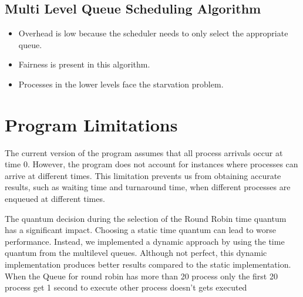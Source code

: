 \documentclass{article}
\begin{document}
\subsection{Multi Level Queue Scheduling Algorithm}
\begin{itemize}
  \item Overhead is low because the scheduler needs to only select the appropriate queue.
  \item Fairness is present in this algorithm.
  \item Processes in the lower levels face the starvation problem.
\end{itemize}

\section{Program Limitations}
The current version of the program assumes that all process arrivals occur at time 0. However, the program does not account for instances where processes can arrive at different times. This limitation prevents us from obtaining accurate results, such as waiting time and turnaround time, when different processes are enqueued at different times.

The quantum decision during the selection of the Round Robin time quantum has a significant impact. Choosing a static time quantum can lead to worse performance. Instead, we implemented a dynamic approach by using the time quantum from the multilevel queues. Although not perfect, this dynamic implementation produces better results compared to the static implementation.
When the Queue for round robin has more than 20 process only the first 20 process get 1 second to execute other process doesn't gets executed
\end{document}
